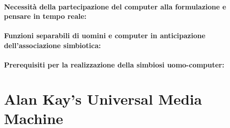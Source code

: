 \paragraph{Necessità della partecipazione del computer alla formulazione e 
pensare in tempo reale:}

\paragraph{Funzioni separabili di uomini e computer in anticipazione dell'associazione
simbiotica:}

\paragraph{Prerequisiti per la realizzazione della simbiosi uomo-computer:}

\section{Alan Kay's Universal Media Machine}